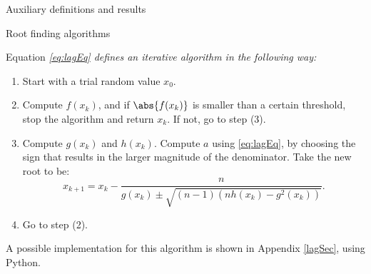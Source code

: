 \documentclass[11pt, a4paper, english, twoside, notitlepage, openright]{report}
\begin{document}
\begin{chapter}{Auxiliary definitions and results}
\begin{section}{Root finding algorithms}
\begin{proposition}
Equation \em \ref{eq:lagEq} \em defines an iterative algorithm in the following way:
\em
\begin{enumerate}[(1)]
\item Start with a trial random value $x_0$.
\item Compute $f(x_k)$, and if $\abs{f(x_k)}$ is smaller than a certain threshold, stop the algorithm and return $x_k$. If not, go to step (3).
\item Compute $g(x_k)$ and $h(x_k)$. Compute $a$ using \ref{eq:lagEq}, by choosing the sign that results in the larger magnitude of the denominator. Take the new root to be:
$$
x_{k+1}=x_k-\frac{n}{g(x_k)\pm\sqrt{ (n-1)(nh(x_k)-g^2(x_k))}}.
$$ 
\item Go to step (2).
\end{enumerate}
\em
\end{proposition}

A possible implementation for this algorithm is shown in Appendix \ref{lagSec}, using Python.


\end{section}
\end{chapter}
\end{document}
